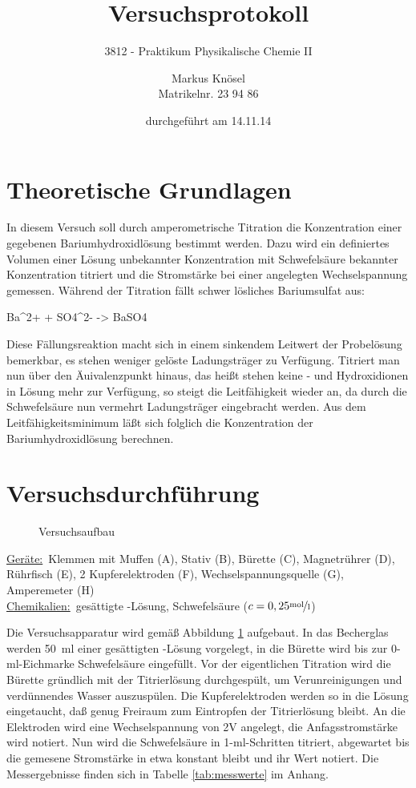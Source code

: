 \documentclass[11pt,titlepage]{scrartcl}		%
\title{Versuchsprotokoll}
\subtitle{3812 - Praktikum Physikalische Chemie II}
\author{\normalfont Markus Knösel \\ Matrikelnr. 23 94 86 }
\date{durchgeführt am 14.11.14} %
\begin{document}
	\maketitle
	\tableofcontents
	\newpage
%
%
\section{Theoretische Grundlagen}
In diesem Versuch soll durch amperometrische Titration die Konzentration einer gegebenen Bariumhydroxidlösung bestimmt werden. Dazu wird ein definiertes Volumen einer Lösung unbekannter Konzentration mit Schwefelsäure bekannter Konzentration titriert und die Stromstärke bei einer angelegten Wechselspannung gemessen. Während der Titration fällt schwer lösliches Bariumsulfat aus:
\begin{reaction}
	Ba^2+ + SO4^2- -> BaSO4
\end{reaction}
Diese Fällungsreaktion macht sich in einem sinkendem Leitwert der Probelösung bemerkbar, es stehen weniger gelöste Ladungsträger zu Verfügung. Titriert man nun über den Äuivalenzpunkt hinaus, das heißt stehen keine - und Hydroxidionen in Lösung mehr zur Verfügung, so steigt die Leitfähigkeit wieder an, da durch die Schwefelsäure nun vermehrt Ladungsträger eingebracht werden. Aus dem Leitfähigkeitsminimum läßt sich folglich die Konzentration der Bariumhydroxidlösung berechnen.
%
%
\section{Versuchsdurchführung}
\begin{figure}[h]
	\centering
	\caption{Versuchsaufbau}
	\label{fig:aufbau}
\end{figure}
%
\begin{singlespace}
	\small\underline{Geräte:}~Klemmen mit Muffen (A), Stativ (B), Bürette (C), Magnetrührer (D), Rührfisch (E), 2 Kupferelektroden (F), Wechselspannungsquelle (G), Amperemeter (H)\\[1ex]
	\underline{Chemikalien:}~gesättigte -Lösung, Schwefelsäure ($c = 0,25 \unitfrac{mol}{l}$)\\[1ex]
\end{singlespace}
%
Die Versuchsapparatur wird gemäß Abbildung \ref{fig:aufbau} aufgebaut. In das Becherglas werden 50~ml einer gesättigten -Lösung vorgelegt, in die Bürette wird bis zur 0-ml-Eichmarke Schwefelsäure eingefüllt. Vor der eigentlichen Titration wird die Bürette gründlich mit der Titrierlösung durchgespült, um Verunreinigungen und verdünnendes Wasser auszuspülen. Die Kupferelektroden werden so in die Lösung eingetaucht, daß genug Freiraum zum Eintropfen der Titrierlösung bleibt. An die Elektroden wird eine Wechselspannung von 2V angelegt, die Anfagsstromstärke wird notiert. Nun wird die Schwefelsäure in 1-ml-Schritten titriert, abgewartet bis die gemesene Stromstärke in etwa konstant bleibt und ihr Wert notiert. Die Messergebnisse finden sich in Tabelle \ref{tab:messwerte} im Anhang.
%
\end{document}
